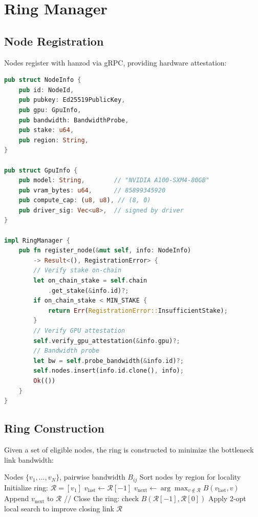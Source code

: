 \documentclass[11pt,letterpaper]{article}
\begin{document}
\section{Ring Manager}
\label{sec:ring}

\subsection{Node Registration}

Nodes register with hanzod via gRPC, providing hardware attestation:

\begin{lstlisting}[language=Rust,caption=Node registration]
pub struct NodeInfo {
    pub id: NodeId,
    pub pubkey: Ed25519PublicKey,
    pub gpu: GpuInfo,
    pub bandwidth: BandwidthProbe,
    pub stake: u64,
    pub region: String,
}

pub struct GpuInfo {
    pub model: String,        // "NVIDIA A100-SXM4-80GB"
    pub vram_bytes: u64,      // 85899345920
    pub compute_cap: (u8, u8), // (8, 0)
    pub driver_sig: Vec<u8>,  // signed by driver
}

impl RingManager {
    pub fn register_node(&mut self, info: NodeInfo)
        -> Result<(), RegistrationError> {
        // Verify stake on-chain
        let on_chain_stake = self.chain
            .get_stake(&info.id)?;
        if on_chain_stake < MIN_STAKE {
            return Err(RegistrationError::InsufficientStake);
        }
        // Verify GPU attestation
        self.verify_gpu_attestation(&info.gpu)?;
        // Bandwidth probe
        let bw = self.probe_bandwidth(&info.id)?;
        self.nodes.insert(info.id.clone(), info);
        Ok(())
    }
}
\end{lstlisting}

\subsection{Ring Construction}

Given a set of eligible nodes, the ring is constructed to minimize the bottleneck link bandwidth:

\begin{algorithm}[t]
\caption{Ring Construction}
\label{alg:ring}
\begin{algorithmic}[1]
\REQUIRE Nodes $\{v_1, \ldots, v_N\}$, pairwise bandwidth $B_{ij}$
\STATE Sort nodes by region for locality
\STATE Initialize ring: $\mathcal{R} = [v_1]$
    \STATE $v_{\text{last}} \leftarrow \mathcal{R}[-1]$
    \STATE $v_{\text{next}} \leftarrow \arg\max_{v \notin \mathcal{R}} B(v_{\text{last}}, v)$
    \STATE Append $v_{\text{next}}$ to $\mathcal{R}$
\ENDWHILE
\STATE // Close the ring: check $B(\mathcal{R}[-1], \mathcal{R}[0])$
    \STATE Apply 2-opt local search to improve closing link
\ENDIF
\RETURN $\mathcal{R}$
\end{algorithmic}
\end{algorithm}
\end{document}

